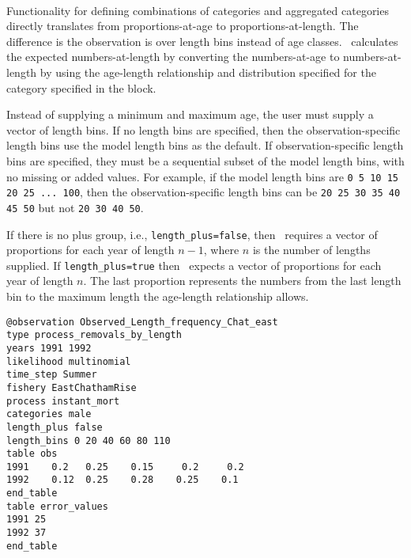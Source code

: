 \paragraph*{}\label{sec:Observation-ProportionsAtLength}

Functionality for defining combinations of categories and aggregated categories directly translates from proportions-at-age to proportions-at-length. The difference is the observation is over length bins instead of age classes. \CNAME\ calculates the expected numbers-at-length by converting the numbers-at-age to numbers-at-length by using the age-length relationship and distribution specified for the category specified in the  block.

Instead of supplying a minimum and maximum age, the user must supply a vector of length bins. If no length bins are specified, then the observation-specific length bins use the model length bins as the default. If observation-specific length bins are specified, they must be a sequential subset of the model length bins, with no missing or added values. For example, if the model length bins are \texttt{0 5 10 15 20 25 ... 100}, then the observation-specific length bins can be \texttt{20 25 30 35 40 45 50} but not \texttt{20 30 40 50}.

If there is no plus group, i.e., \texttt{length\_plus=false}, then \CNAME\ requires a vector of proportions for each year of length $n - 1$, where $n$ is the number of lengths supplied. If \texttt{length\_plus=true} then \CNAME\ expects a vector of proportions for each year of length $n$. The last proportion represents the numbers from the last length bin to the maximum length the age-length relationship allows.

{\small{\begin{verbatim}
@observation Observed_Length_frequency_Chat_east
type process_removals_by_length
years 1991 1992
likelihood multinomial
time_step Summer
fishery EastChathamRise
process instant_mort
categories male
length_plus false
length_bins 0 20 40 60 80 110
table obs
1991    0.2   0.25    0.15     0.2     0.2
1992    0.12  0.25    0.28    0.25    0.1
end_table
table error_values
1991 25
1992 37
end_table
\end{verbatim}}}


\paragraph*{}\label{sec:Observation-ProportionsByCategory}

